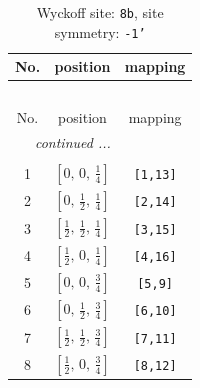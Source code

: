 \documentclass[fleqn,8pt]{jsarticle}
\begin{document}
\begin{longtable}{ccc}
\caption{Wyckoff site: {\tt 8b}, site symmetry: {\tt -1'}}
 \\
 \hline \hline
No. & position & mapping \\ \hline \endfirsthead

\multicolumn{2}{l}{\tablename\ \thetable{}} \\
 \hline \hline
No. & position & mapping \\ \hline \endhead

 \hline \hline
\multicolumn{2}{r}{\footnotesize\it continued ...} \\ \endfoot

 \hline \hline
\multicolumn{2}{r}{} \\ \endlastfoot

1 & $\left[ 0,\, 0,\, \frac{1}{4} \right]$ & {\tt [1,13]} \\ \hline
2 & $\left[ 0,\, \frac{1}{2},\, \frac{1}{4} \right]$ & {\tt [2,14]} \\ \hline
3 & $\left[ \frac{1}{2},\, \frac{1}{2},\, \frac{1}{4} \right]$ & {\tt [3,15]} \\ \hline
4 & $\left[ \frac{1}{2},\, 0,\, \frac{1}{4} \right]$ & {\tt [4,16]} \\ \hline
5 & $\left[ 0,\, 0,\, \frac{3}{4} \right]$ & {\tt [5,9]} \\ \hline
6 & $\left[ 0,\, \frac{1}{2},\, \frac{3}{4} \right]$ & {\tt [6,10]} \\ \hline
7 & $\left[ \frac{1}{2},\, \frac{1}{2},\, \frac{3}{4} \right]$ & {\tt [7,11]} \\ \hline
8 & $\left[ \frac{1}{2},\, 0,\, \frac{3}{4} \right]$ & {\tt [8,12]} \\
\end{longtable}
\renewcommand{\arraystretch}{1.2}
\end{document}

